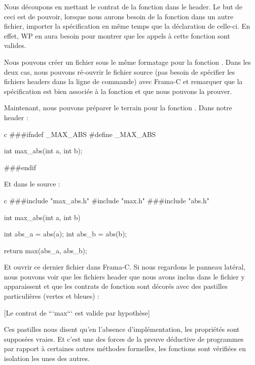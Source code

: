 \documentclass[middle]{zmdocument}
\begin{document}
Nous découpons en mettant le contrat de la fonction dans le header. Le but de
ceci est de pouvoir, lorsque nous aurons besoin de la fonction dans un autre 
fichier, importer la spécification en même temps que la déclaration de 
celle-ci. En effet, WP en aura besoin pour montrer que les appels à cette 
fonction sont valides.



Nous pouvons créer un fichier sous le même formatage pour la fonction .
Dans les deux cas, nous pouvons ré-ouvrir le fichier source (pas besoin de 
spécifier les fichiers headers dans la ligne de commande) avec Frama-C et 
remarquer que la spécification est bien associée à la fonction et que nous
pouvons la prouver.



Maintenant, nous pouvons préparer le terrain pour la fonction . 
Dans notre header :



\begin{CodeBlock}{c}
###ifndef _MAX_ABS
#define _MAX_ABS

int max_abs(int a, int b);

###endif
\end{CodeBlock}



Et dans le source :



\begin{CodeBlock}{c}
###include "max_abs.h"
#include "max.h"
###include "abs.h"

int max_abs(int a, int b){
  int abs_a = abs(a);
  int abs_b = abs(b);

  return max(abs_a, abs_b);
}
\end{CodeBlock}



Et ouvrir ce dernier fichier dans Frama-C. Si nous regardons le panneau latéral, 
nous pouvons voir que les fichiers header que nous avons inclus dans le fichier 
 y apparaissent et que les contrats de fonction sont décorés avec des 
pastilles particulières (vertes et bleues) :



[Le contrat de ```max``` est valide par hypothèse]


Ces pastilles nous disent qu'en l'absence d'implémentation, les propriétés sont
supposées vraies. Et c'est une des forces de la preuve déductive de programmes 
par rapport à certaines autres méthodes formelles, les fonctions sont vérifiées
en isolation les unes des autres.
\end{document}
